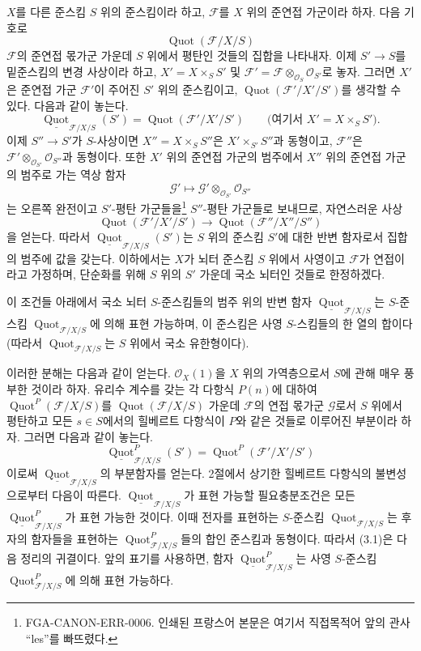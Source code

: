 
$X$를 다른 준스킴 $S$ 위의 준스킴이라 하고, $\mathcal F$를 $X$ 위의
준연접 가군이라 하자. 다음 기호로
\[
\operatorname{Quot}(\mathcal F/X/S)
\]
$\mathcal F$의 준연접 몫가군 가운데 $S$ 위에서 평탄인 것들의 집합을
나타내자. 이제 $S'\longrightarrow S$를 밑준스킴의 변경 사상이라 하고,
$X'=X\times_S S'$ 및
$\mathcal F'=\mathcal F\otimes_{\mathcal O_S}\mathcal O_{S'}$로 놓자.
그러면 $X'$은 준연접 가군
$\mathcal F'$이 주어진 $S'$ 위의 준스킴이고,
$\operatorname{Quot}(\mathcal F'/X'/S')$를 생각할 수 있다. 다음과 같이
놓는다.
\[
\underline{\operatorname{Quot}}_{\mathcal F/X/S}(S')
=\operatorname{Quot}(\mathcal F'/X'/S')
\qquad\text{(여기서 $X'=X\times_SS'$)}.
\]
이제 $S''\longrightarrow S'$가 $S$-사상이면
$X''=X\times_SS''$은 $X'\times_{S'}S''$과 동형이고, $\mathcal F''$은
$\mathcal F'\otimes_{\mathcal O_{S'}}\mathcal O_{S''}$과 동형이다. 또한
$X'$ 위의 준연접 가군의 범주에서 $X''$ 위의 준연접 가군의 범주로 가는
역상 함자
\[
\mathcal G'\longmapsto
\mathcal G'\otimes_{\mathcal O_{S'}}\mathcal O_{S''}
\]
는 오른쪽 완전이고 $S'$-평탄 가군들을\footnote{FGA-CANON-ERR-0006.
인쇄된 프랑스어 본문은 여기서 직접목적어 앞의 관사 ``les''를
빠뜨렸다.} $S''$-평탄 가군들로 보내므로, 자연스러운 사상
\[
\operatorname{Quot}(\mathcal F'/X'/S')\longrightarrow
\operatorname{Quot}(\mathcal F''/X''/S'')
\]
을 얻는다. 따라서 $\underline{\operatorname{Quot}}_{\mathcal F/X/S}(S')$는
$S$ 위의 준스킴 $S'$에 대한 반변 함자로서 집합의 범주에 값을 갖는다.
이하에서는 $X$가 뇌터 준스킴 $S$ 위에서 사영이고 $\mathcal F$가
연접이라고 가정하며, 단순화를 위해 $S$ 위의 $S'$ 가운데 국소 뇌터인
것들로 한정하겠다.

 이 조건들 아래에서 국소 뇌터 $S$-준스킴들의 범주
위의 반변 함자 $\underline{\operatorname{Quot}}_{\mathcal F/X/S}$는
$S$-준스킴 $\operatorname{Quot}_{\mathcal F/X/S}$에 의해 표현 가능하며,
이 준스킴은 사영 $S$-스킴들의 한 열의 합이다(따라서
$\operatorname{Quot}_{\mathcal F/X/S}$는 $S$ 위에서 국소 유한형이다).

이러한 분해는 다음과 같이 얻는다. $\mathcal O_X(1)$을 $X$ 위의
가역층으로서 $S$에 관해 매우 풍부한 것이라 하자. 유리수 계수를 갖는
각 다항식 $P(n)$에 대하여 $\operatorname{Quot}^P(\mathcal F/X/S)$를
$\operatorname{Quot}(\mathcal F/X/S)$ 가운데 $\mathcal F$의 연접
몫가군 $\mathcal G$로서 $S$ 위에서 평탄하고 모든 $s\in S$에서의
힐베르트 다항식이 $P$와 같은 것들로 이루어진 부분이라 하자. 그러면
다음과 같이 놓는다.
\[
\underline{\operatorname{Quot}}^P_{\mathcal F/X/S}(S')
=\operatorname{Quot}^P(\mathcal F'/X'/S')
\]
이로써 $\underline{\operatorname{Quot}}_{\mathcal F/X/S}$의 부분함자를
얻는다. 2절에서 상기한 힐베르트 다항식의 불변성으로부터 다음이
따른다. $\underline{\operatorname{Quot}}_{\mathcal F/X/S}$가 표현
가능할 필요충분조건은 모든
$\underline{\operatorname{Quot}}^P_{\mathcal F/X/S}$가 표현 가능한
것이다. 이때 전자를 표현하는 $S$-준스킴
$\operatorname{Quot}_{\mathcal F/X/S}$는 후자의 함자들을 표현하는
$\operatorname{Quot}^P_{\mathcal F/X/S}$들의 합인 준스킴과 동형이다.
따라서 (3.1)은 다음 정리의 귀결이다.
 앞의 표기를 사용하면, 함자
$\underline{\operatorname{Quot}}^P_{\mathcal F/X/S}$는 사영
$S$-준스킴 $\operatorname{Quot}^P_{\mathcal F/X/S}$에 의해 표현
가능하다.

